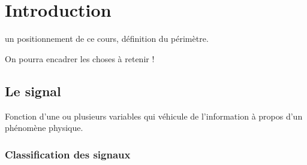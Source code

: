 \documentclass[]{book}
\begin{document}
	
	
	

	
	
	
	



\pagestyle{empty} %

\tableofcontents %

\cleardoublepage %

\pagestyle{fancy} %


	
\chapter{Introduction}
	
	un positionnement de ce cours, définition du périmètre.
	
	On pourra encadrer les choses à retenir !
	
	\section{Le signal}
	
	
	Fonction d'une ou plusieurs variables qui véhicule de l'information à
	propos d'un phénomène physique.
	
	\subsection{Classification des signaux}
	
\end{document}
